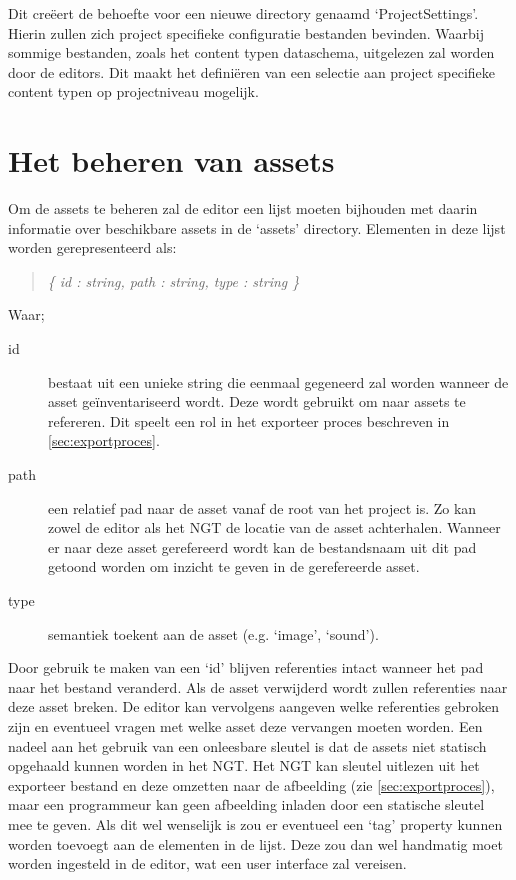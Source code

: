 Dit creëert de behoefte voor een nieuwe directory genaamd ‘ProjectSettings’. Hierin zullen zich project specifieke configuratie bestanden bevinden. Waarbij sommige bestanden, zoals het content typen dataschema, uitgelezen zal worden door de editors. Dit maakt het definiëren van een selectie aan project specifieke content typen op projectniveau mogelijk.

\section{Het beheren van assets}
\label{sec:assetmanagement}
Om de assets te beheren zal de editor een lijst moeten bijhouden met daarin informatie over beschikbare assets in de ‘assets’ directory. Elementen in deze lijst worden gerepresenteerd als:
\begin{quote} 
    \centering    
    \textit{
        \{ id : string, path : string, type : string \} 
    }
\end{quote}
\noindent Waar;
\begin{description}
    \item[id] bestaat uit een unieke string die eenmaal gegeneerd zal worden wanneer de asset geïnventariseerd wordt. Deze wordt gebruikt om naar assets te refereren. Dit speelt een rol in het exporteer proces beschreven in \autoref{sec:exportproces}.
    \item[path] een relatief pad naar de asset vanaf de root van het project is. Zo kan zowel de editor als het NGT de locatie van de asset achterhalen. Wanneer er naar deze asset gerefereerd wordt kan de bestandsnaam uit dit pad getoond worden om inzicht te geven in de gerefereerde asset.
    \item[type] semantiek toekent aan de asset (e.g. ‘image’, ‘sound’).
\end{description}

Door gebruik te maken van een ‘id’ blijven referenties intact wanneer het pad naar het bestand veranderd. Als de asset verwijderd wordt zullen referenties naar deze asset breken. De editor kan vervolgens aangeven welke referenties gebroken zijn en eventueel vragen met welke asset deze vervangen moeten worden. Een nadeel aan het gebruik van een onleesbare sleutel is dat de assets niet statisch opgehaald kunnen worden in het NGT. Het NGT kan sleutel uitlezen uit het exporteer bestand en deze omzetten naar de afbeelding (zie \autoref{sec:exportproces}), maar een programmeur kan geen afbeelding inladen door een statische sleutel mee te geven. Als dit wel wenselijk is zou er eventueel een ‘tag’ property kunnen worden toevoegt aan de elementen in de lijst. Deze zou dan wel handmatig moet worden ingesteld in de editor, wat een user interface zal vereisen.

